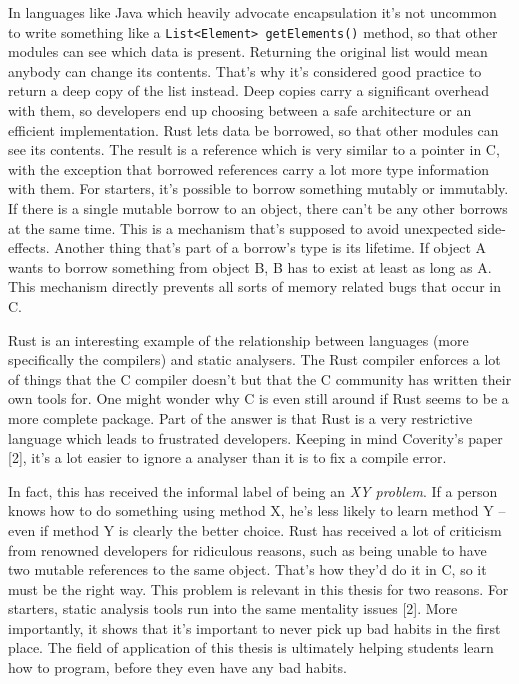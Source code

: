 \documentclass[]{article}
\begin{document}
In languages like Java which heavily advocate encapsulation it's not
uncommon to write something like a
\texttt{List\textless{}Element\textgreater{}\ getElements()} method, so
that other modules can see which data is present. Returning the original
list would mean anybody can change its contents. That's why it's
considered good practice to return a deep copy of the list instead. Deep
copies carry a significant overhead with them, so developers end up
choosing between a safe architecture or an efficient implementation.
Rust lets data be borrowed, so that other modules can see its contents.
The result is a reference which is very similar to a pointer in C, with
the exception that borrowed references carry a lot more type information
with them. For starters, it's possible to borrow something mutably or
immutably. If there is a single mutable borrow to an object, there can't
be any other borrows at the same time. This is a mechanism that's
supposed to avoid unexpected side-effects. Another thing that's part of
a borrow's type is its lifetime. If object A wants to borrow something
from object B, B has to exist at least as long as A. This mechanism
directly prevents all sorts of memory related bugs that occur in C.

Rust is an interesting example of the relationship between languages
(more specifically the compilers) and static analysers. The Rust
compiler enforces a lot of things that the C compiler doesn't but that
the C community has written their own tools for. One might wonder why C
is even still around if Rust seems to be a more complete package. Part
of the answer is that Rust is a very restrictive language which leads to
frustrated developers. Keeping in mind Coverity's paper {[}2{]}, it's a
lot easier to ignore a analyser than it is to fix a compile error.

In fact, this has received the informal label of being an \emph{XY
problem}. If a person knows how to do something using method X, he's
less likely to learn method Y -- even if method Y is clearly the better
choice. Rust has received a lot of criticism from renowned developers
for ridiculous reasons, such as being unable to have two mutable
references to the same object. That's how they'd do it in C, so it must
be the right way. This problem is relevant in this thesis for two
reasons. For starters, static analysis tools run into the same mentality
issues {[}2{]}. More importantly, it shows that it's important to never
pick up bad habits in the first place. The field of application of this
thesis is ultimately helping students learn how to program, before they
even have any bad habits.
\end{document}
